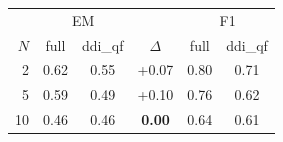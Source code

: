 \begin{tabular}{rccccc}
\toprule
& \multicolumn{2}{c}{EM} & & \multicolumn{2}{c}{F1} \\
$N$ & full & ddi\_qf & $\Delta$ & full & ddi\_qf \\
\midrule
2 & 0.62 & 0.55 & +0.07 & 0.80 & 0.71 \\
5 & 0.59 & 0.49 & +0.10 & 0.76 & 0.62 \\
10 & 0.46 & 0.46 & \textbf{0.00} & 0.64 & 0.61 \\
\bottomrule
\end{tabular}
